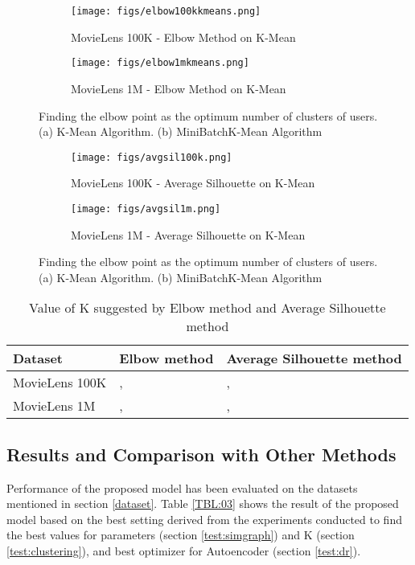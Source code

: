 \documentclass[a4paper,fleqn]{cas-dc}
\begin{document}
\begin{figure}

	\begin{subfigure}{.5\textwidth}
		\centering
		\texttt{[image: figs/elbow100kkmeans.png]}
		\caption{MovieLens 100K - Elbow Method on K-Mean}
		\label{fig:sfig1}
	\end{subfigure}
	\begin{subfigure}{.5\textwidth}
		\centering
		\texttt{[image: figs/elbow1mkmeans.png]}
		\caption{MovieLens 1M - Elbow Method on K-Mean}
		\label{fig:sfig1}
	\end{subfigure}

	\caption{Finding the elbow point as the optimum number of clusters of users. (a) K-Mean Algorithm. (b) MiniBatchK-Mean Algorithm}
	\label{FIG:11}
\end{figure}

\begin{figure}

	\begin{subfigure}{.5\textwidth}
		\centering
		\texttt{[image: figs/avgsil100k.png]}
		\caption{MovieLens 100K - Average Silhouette on K-Mean}
		\label{fig:sfig1}
	\end{subfigure}
	\begin{subfigure}{.5\textwidth}
		\centering
		\texttt{[image: figs/avgsil1m.png]}
		\caption{MovieLens 1M - Average Silhouette on K-Mean}
		\label{fig:sfig1}
	\end{subfigure}

	\caption{Finding the elbow point as the optimum number of clusters of users. (a) K-Mean Algorithm. (b) MiniBatchK-Mean Algorithm}
	\label{FIG:12}
\end{figure}

\begin{table*}[width=.8\textwidth,cols=3,pos=h]
	\centering
	\caption{Value of K suggested by Elbow method and Average Silhouette method}\label{TBL:02}
	\begin{tabular*}{\tblwidth}{@{} LLL@{} }
		\toprule
		Dataset & Elbow method & Average Silhouette method\\
		\midrule
		MovieLens 100K & ,  & ,  \\
		MovieLens 1M & ,  & , \\
		\bottomrule
	\end{tabular*}
\end{table*}


\subsection{Results and Comparison with Other Methods}
\label{test:res}
Performance of the proposed model has been evaluated on the datasets mentioned in section \ref{dataset}. Table \ref{TBL:03} shows the result of the proposed model based on the best setting derived from the experiments conducted to find the best values for parameters  (section \ref{test:simgraph}) and K (section \ref{test:clustering}), and best optimizer for Autoencoder (section \ref{test:dr}).
\end{document}
